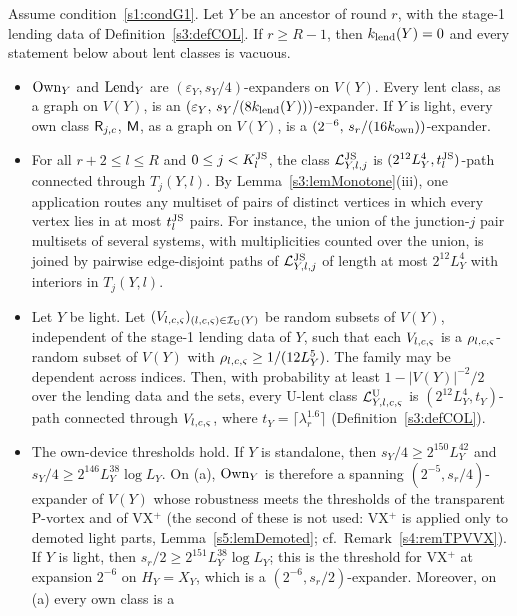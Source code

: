 \begin{lemma}\label{s3:lemCOL}
Assume condition~\ref{s1:condG1}. Let $Y$ be an ancestor of round $r$, with the stage-1
lending data of Definition~\ref{s3:defCOL}. If $r\ge R-1$, then
$k_{\mathrm{lend}}(Y)=0$ and every statement below about lent classes is vacuous.
\begin{itemize}
\item[(a)] $\mathrm{Own}_Y$ and $\mathrm{Lend}_Y$ are $(\varepsilon_Y,s_Y/4)$-expanders
  on $V(Y)$. Every lent class, as a graph on $V(Y)$, is an
  $(\varepsilon_Y,\,s_Y/(8k_{\mathrm{lend}}(Y)))$-expander. If $Y$ is light, every
  own class $\mathsf{R}_{j,c}$, $\mathsf{M}$, as a graph on $V(Y)$, is a
  $(2^{-6},\,s_r/(16k_{\mathrm{own}}))$-expander.
\item[(b)] For all $r+2\le l\le R$ and $0\le j<K^{\mathrm{JS}}_l$, the class
  $\mathcal{L}^{\mathrm{JS}}_{Y,l,j}$ is $(2^{12}L_Y^4,t^{\mathrm{JS}}_l)$-path connected through
  $T_j(Y,l)$. By Lemma~\ref{s3:lemMonotone}(iii), one application routes
  any multiset of pairs of distinct vertices in which every vertex lies
  in at most $t^{\mathrm{JS}}_l$ pairs. For instance, the union of the junction-$j$
  pair multisets of several systems, with multiplicities counted over
  the union, is joined by pairwise edge-disjoint paths of
  $\mathcal{L}^{\mathrm{JS}}_{Y,l,j}$ of length at most $2^{12}L_Y^4$ with interiors in
  $T_j(Y,l)$.
\item[(c)] Let $Y$ be light. Let $(V_{l,c,\varsigma})_{(l,c,\varsigma)\in\mathcal{I}_{\mathrm{U}}(Y)}$
  be random subsets of $V(Y)$, independent of the stage-1 lending data
  of $Y$, such that each $V_{l,c,\varsigma}$ is a
  $\rho_{l,c,\varsigma}$-random subset of $V(Y)$ with
  $\rho_{l,c,\varsigma}\ge1/(12L_Y^5)$. The family may be dependent across
  indices. Then, with probability at least $1-|V(Y)|^{-2}/2$ over the
  lending data and the sets, every U-lent class $\mathcal{L}^{\mathrm{U}}_{Y,l,c,\varsigma}$ is
  $(2^{12}L_Y^4,t_Y)$-path connected through $V_{l,c,\varsigma}$, where
  $t_Y=\lceil\lambda_r^{1.6}\rceil$ (Definition~\ref{s3:defCOL}).
\item[(e)] The own-device thresholds hold. If $Y$ is standalone, then
  $s_Y/4\ge2^{150}L_Y^{42}$ and $s_Y/4\ge2^{146}L_Y^{38}\log L_Y$. On (a),
  $\mathrm{Own}_Y$ is therefore a spanning $(2^{-5},s_r/4)$-expander of $V(Y)$
  whose robustness meets the thresholds of the transparent P-vortex
  and of VX$^+$ (the second of these is not used: VX$^+$ is applied only to
  demoted light parts, Lemma~\ref{s5:lemDemoted}; cf.\
  Remark~\ref{s4:remTPVVX}). If $Y$ is light, then
  $s_r/2\ge2^{151}L_Y^{38}\log L_Y$; this is the threshold for VX$^+$ at
  expansion $2^{-6}$ on $H_Y=X_Y$, which is a
  $(2^{-6},s_r/2)$-expander. Moreover, on (a) every own class is a

\end{itemize}
\end{lemma}
